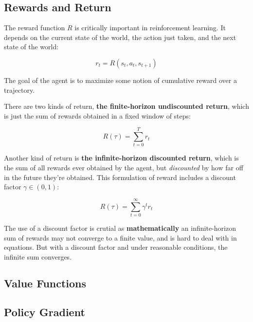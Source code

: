 \subsection{Rewards and Return}

The reward function \(R\) is critically important in reinforcement learning. It depends on the current state of the world, the action just taken, and the next state of the world:

\begin{center}
\begin{equation}
r_{t}=R\left(s_{t}, a_{t}, s_{t+1}\right)
\end{equation}
\end{center}

The goal of the agent is to maximize some notion of cumulative reward over a trajectory.

There are two kinds of return, \textbf{the finite-horizon undiscounted return}, which is just the sum of rewards obtained in a fixed window of steps:

\begin{center}
\begin{equation} \label{eq:1}
R(\tau)=\sum_{t=0}^{T} r_{t}
\end{equation}
\end{center}

Another kind of return is \textbf{the infinite-horizon discounted return}, which is the sum of all rewards ever obtained by the agent, but \textit{discounted} by how far off in the future they’re obtained. This formulation of reward includes a discount factor \(\gamma \in(0,1)\):

\begin{center}
\begin{equation} \label{eq:2}
R(\tau)=\sum_{t=0}^{\infty} \gamma^{t} r_{t}
\end{equation}
\end{center}

The use of a discount factor is crutial as \textbf{mathematically} an infinite-horizon sum of rewards may not converge to a finite value, and is hard to deal with in equations. But with a discount factor and under reasonable conditions, the infinite sum converges.


\subsection{Value Functions}
\subsection{Policy Gradient}
